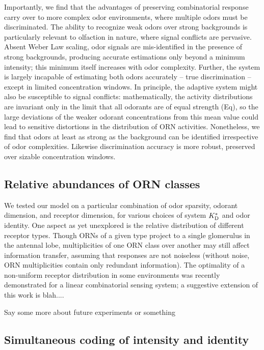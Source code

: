 Importantly, we find that the advantages of preserving combinatorial response carry over to more complex odor environments, where multiple odors must be discriminated. The ability to recognize weak odors over strong backgrounds is particularly relevant to olfaction in nature, where signal conflicts are pervasive. Absent Weber Law scaling, odor signals are mis-identified in the presence of strong backgrounds, producing accurate estimations only beyond a minimum intensity; this minimum itself increases with odor complexity. Further, the system is largely incapable of estimating both odors accurately -- true discrimination -- except in limited concentration windows. In principle, the adaptive system might also be susceptible to signal conflicts: mathematically, the activity distributions are invariant only in the limit that all odorants are of equal strength (Eq), so the large deviations of the weaker odorant concentrations from this mean value could lead to sensitive distortions in the distribution of ORN activities. Nonetheless, we find that odors at least as strong as the background can be identified irrespective of odor complexities. Likewise discrimination accuracy is more robust, preserved over sizable concentration windows. 


\subsection{Relative abundances of ORN classes}
We tested our model on a particular combination of odor sparsity, odorant dimension, and receptor dimension, for various choices of system $K^*_{\text D}$ and odor identity. One aspect as yet unexplored is the relative distribution of different receptor types. Though ORNs of a given type project to a single glomerulus in the antennal lobe, multiplicities of one ORN class over another may still affect information transfer, assuming that responses are not noiseless (without noise, ORN multiplicities contain only redundant information). The optimality of a non-uniform receptor distribution in some environments was recently demonstrated for a linear combinatorial sensing system; a suggestive extension of this work is blah....





{\color{blue} Say some more about future experiments or something}


\subsection{Simultaneous coding of intensity and identity}

